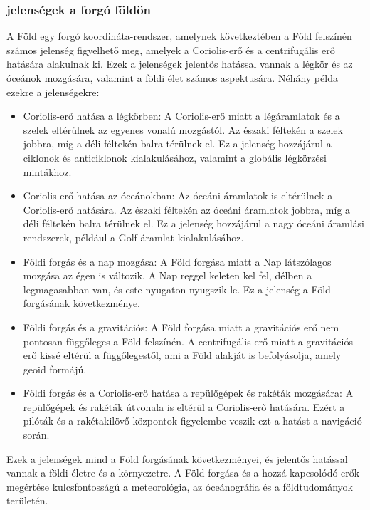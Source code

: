 \documentclass[a4paper,12pt]{article}
\begin{document}
\subsubsection{jelenségek a forgó földön}
A Föld egy forgó koordináta-rendszer, amelynek következtében a Föld felszínén számos jelenség figyelhető meg, amelyek a Coriolis-erő és a centrifugális erő hatására alakulnak ki. Ezek a jelenségek jelentős hatással vannak a légkör és az óceánok mozgására, valamint a földi élet számos aspektusára. Néhány példa ezekre a jelenségekre:
\begin{itemize}
    \item Coriolis-erő hatása a légkörben: A Coriolis-erő miatt a légáramlatok és a szelek eltérülnek az egyenes vonalú mozgástól. Az északi féltekén a szelek jobbra, míg a déli féltekén balra térülnek el. Ez a jelenség hozzájárul a ciklonok és anticiklonok kialakulásához, valamint a globális légkörzési mintákhoz.
    \item Coriolis-erő hatása az óceánokban: Az óceáni áramlatok is eltérülnek a Coriolis-erő hatására. Az északi féltekén az óceáni áramlatok jobbra, míg a déli féltekén balra térülnek el. Ez a jelenség hozzájárul a nagy óceáni áramlási rendszerek, például a Golf-áramlat kialakulásához.
    \item Földi forgás és a nap mozgása: A Föld forgása miatt a Nap látszólagos mozgása az égen is változik. A Nap reggel keleten kel fel, délben a legmagasabban van, és este nyugaton nyugszik le. Ez a jelenség a Föld forgásának következménye.
    \item Földi forgás és a gravitációs: A Föld forgása miatt a gravitációs erő nem pontosan függőleges a Föld felszínén. A centrifugális erő miatt a gravitációs erő kissé eltérül a függőlegestől, ami a Föld alakját is befolyásolja, amely geoid formájú.
    \item Földi forgás és a Coriolis-erő hatása a repülőgépek és rakéták mozgására: A repülőgépek és rakéták útvonala is eltérül a Coriolis-erő hatására. Ezért a pilóták és a rakétakilövő központok figyelembe veszik ezt a hatást a navigáció során.
\end{itemize}
Ezek a jelenségek mind a Föld forgásának következményei, és jelentős hatással vannak a földi életre és a környezetre. A Föld forgása és a hozzá kapcsolódó erők megértése kulcsfontosságú a meteorológia, az óceánográfia és a földtudományok területén.
\end{document}
